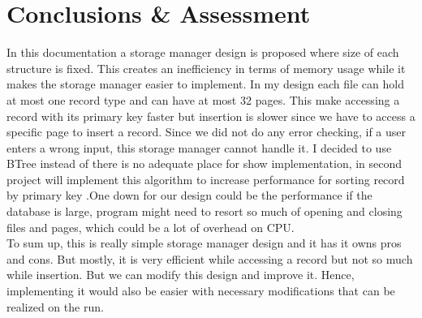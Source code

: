 \documentclass{article}
\newcounter{terms}
\begin{document}
\section{Conclusions \& Assessment}
    In this documentation a storage manager design is proposed where size of each
structure is fixed. This creates an inefficiency in terms of memory usage while
it makes the storage manager easier to implement.  In my design each file can hold at most one record type and can have at most 32 pages. This make accessing a record with its primary key faster but insertion is slower since we have to access a specific page to insert a record. Since we did not do any error checking, if a user enters a wrong input, this storage manager cannot handle it. I decided to use BTree instead of there is no adequate place for show implementation, in second project will implement this algorithm to increase performance for sorting record by primary key .One down for our design could be the performance if the database is large, program might need to resort so much of opening and closing files and pages, which could be a lot of overhead on CPU.  \\
To sum up, this is really simple storage manager design and it has it owns pros and cons. But mostly, it is very efficient while accessing a record but not so much while insertion. But we can modify this design and improve it. Hence, implementing it would also be easier with necessary modifications that can be realized on the run.
\end{document}
